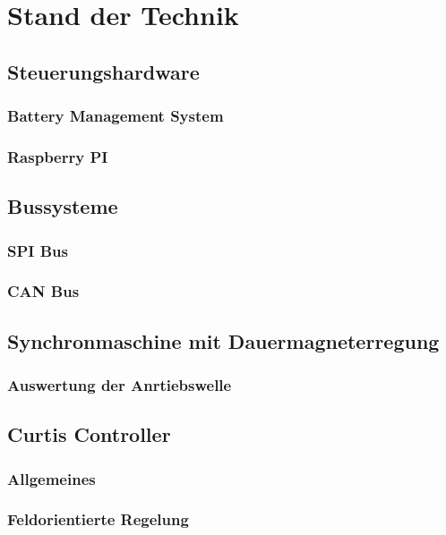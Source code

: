 \chapter{Stand der Technik}

\section{Steuerungshardware}
\subsection{Battery Management System}
\subsection{Raspberry PI}

\section{Bussysteme}
\subsection{SPI Bus}
\subsection{CAN Bus}

\section{Synchronmaschine mit Dauermagneterregung}
\subsection{Auswertung der Anrtiebswelle}

\section{Curtis Controller}
\subsection{Allgemeines}
\subsection{Feldorientierte Regelung}